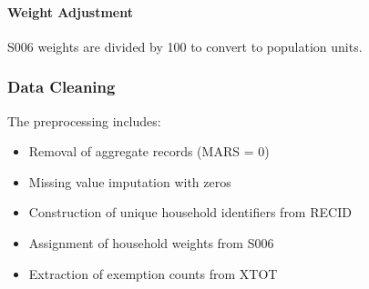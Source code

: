\paragraph{Weight Adjustment}
S006 weights are divided by 100 to convert to population units.

\subsubsection{Data Cleaning}

The preprocessing includes:
\begin{itemize}
    \item Removal of aggregate records (MARS = 0)
    \item Missing value imputation with zeros
    \item Construction of unique household identifiers from RECID
    \item Assignment of household weights from S006
    \item Extraction of exemption counts from XTOT
\end{itemize}
